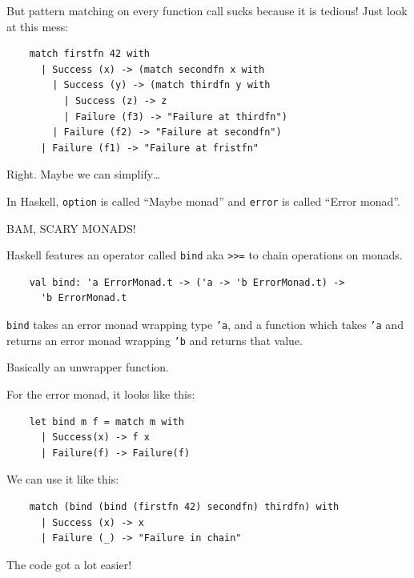 \documentclass{beamer}
\renewcommand{\example}[1]{{\usebeamercolor[fg]{example text} #1}}
\begin{document}
\begin{frame}[fragile]
  But pattern matching on every function call sucks because it is
  \alert{tedious}! Just look at this mess:
  \begin{verbatim}
    match firstfn 42 with
      | Success (x) -> (match secondfn x with
        | Success (y) -> (match thirdfn y with
          | Success (z) -> z
          | Failure (f3) -> "Failure at thirdfn")
        | Failure (f2) -> "Failure at secondfn")
      | Failure (f1) -> "Failure at fristfn"
  \end{verbatim}

  Right. Maybe we can \example{simplify}…

  In Haskell, \texttt{option} is called \enquote{Maybe monad} and
  \texttt{error} is called \enquote{Error monad}.

  \pause
  \begin{center}
    {\Large \alert{BAM, SCARY MONADS!}}
  \end{center}
\end{frame}

\begin{frame}[fragile]
  Haskell features an operator called \texttt{bind} aka \texttt{>>=} to
  chain operations on monads.

  \begin{verbatim}
    val bind: 'a ErrorMonad.t -> ('a -> 'b ErrorMonad.t) ->
      'b ErrorMonad.t
  \end{verbatim}

  \texttt{bind} takes an error monad wrapping type \texttt{'a}, and a function
  which takes \texttt{'a} and returns an error monad wrapping
  \texttt{'b} and returns that value.

  Basically an unwrapper function.
\end{frame}

\begin{frame}[fragile]
  For the error monad, it looks like this:
  \begin{verbatim}
    let bind m f = match m with
      | Success(x) -> f x
      | Failure(f) -> Failure(f)
  \end{verbatim}

  We can use it like this:

  \begin{verbatim}
    match (bind (bind (firstfn 42) secondfn) thirdfn) with
      | Success (x) -> x
      | Failure (_) -> "Failure in chain"
  \end{verbatim}
  The code got a lot \example{easier}!
\end{frame}
\end{document}
